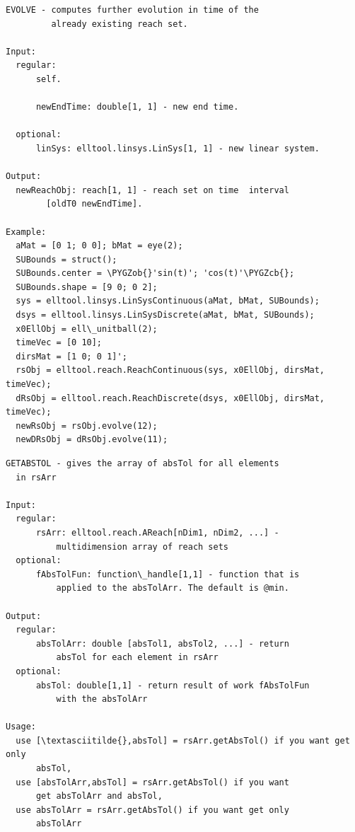 \documentclass[letterpaper,10pt,english]{sphinxmanual}
\def\PYGZob{\char`\{}
\def\PYGZcb{\char`\}}
\begin{document}
\begin{Verbatim}[commandchars=\\\{\}]
EVOLVE - computes further evolution in time of the
         already existing reach set.

Input:
  regular:
      self.

      newEndTime: double[1, 1] - new end time.

  optional:
      linSys: elltool.linsys.LinSys[1, 1] - new linear system.

Output:
  newReachObj: reach[1, 1] - reach set on time  interval
        [oldT0 newEndTime].

Example:
  aMat = [0 1; 0 0]; bMat = eye(2);
  SUBounds = struct();
  SUBounds.center = \PYGZob{}'sin(t)'; 'cos(t)'\PYGZcb{};
  SUBounds.shape = [9 0; 0 2];
  sys = elltool.linsys.LinSysContinuous(aMat, bMat, SUBounds);
  dsys = elltool.linsys.LinSysDiscrete(aMat, bMat, SUBounds);
  x0EllObj = ell\_unitball(2);
  timeVec = [0 10];
  dirsMat = [1 0; 0 1]';
  rsObj = elltool.reach.ReachContinuous(sys, x0EllObj, dirsMat, timeVec);
  dRsObj = elltool.reach.ReachDiscrete(dsys, x0EllObj, dirsMat, timeVec);
  newRsObj = rsObj.evolve(12);
  newDRsObj = dRsObj.evolve(11);
\end{Verbatim}

\begin{Verbatim}[commandchars=\\\{\}]
GETABSTOL - gives the array of absTol for all elements
  in rsArr

Input:
  regular:
      rsArr: elltool.reach.AReach[nDim1, nDim2, ...] -
          multidimension array of reach sets
  optional:
      fAbsTolFun: function\_handle[1,1] - function that is
          applied to the absTolArr. The default is @min.

Output:
  regular:
      absTolArr: double [absTol1, absTol2, ...] - return
          absTol for each element in rsArr
  optional:
      absTol: double[1,1] - return result of work fAbsTolFun
          with the absTolArr

Usage:
  use [\textasciitilde{},absTol] = rsArr.getAbsTol() if you want get only
      absTol,
  use [absTolArr,absTol] = rsArr.getAbsTol() if you want
      get absTolArr and absTol,
  use absTolArr = rsArr.getAbsTol() if you want get only
      absTolArr
\end{Verbatim}
\end{document}
